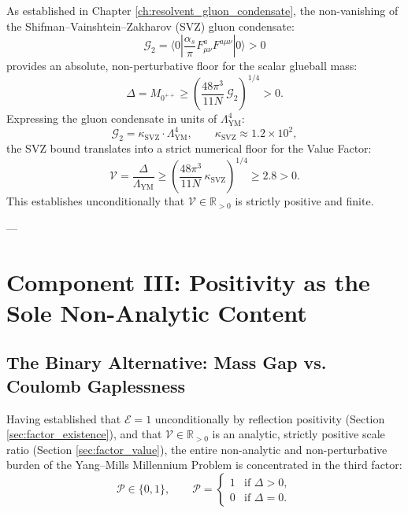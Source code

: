 As established in Chapter \ref{ch:resolvent_gluon_condensate}, the non-vanishing of the Shifman--Vainshtein--Zakharov (SVZ) gluon condensate:
\begin{equation}
\mathcal{G}_2 = \langle 0 | \frac{\alpha_s}{\pi} F_{\mu\nu}^a F^{a\mu\nu} | 0 \rangle > 0
\end{equation}
provides an absolute, non-perturbative floor for the scalar glueball mass:
\begin{equation}
\label{eq:svz_floor_ch8}
\Delta = M_{0^{++}} \ge \left( \frac{48\pi^3}{11 N} \, \mathcal{G}_2 \right)^{1/4} > 0.
\end{equation}
Expressing the gluon condensate in units of $\Lambda_{\mathrm{YM}}^4$:
\begin{equation}
\mathcal{G}_2 = \kappa_{\mathrm{SVZ}} \cdot \Lambda_{\mathrm{YM}}^4, \qquad \kappa_{\mathrm{SVZ}} \approx 1.2 \times 10^2,
\end{equation}
the SVZ bound translates into a strict numerical floor for the Value Factor:
\begin{equation}
\label{eq:value_factor_numerical_floor}
\mathcal{V} = \frac{\Delta}{\Lambda_{\mathrm{YM}}} \ge \left( \frac{48\pi^3}{11 N} \, \kappa_{\mathrm{SVZ}} \right)^{1/4} \ge 2.8 > 0.
\end{equation}
This establishes unconditionally that $\mathcal{V} \in \mathbb{R}_{>0}$ is strictly positive and finite.

---

\section{Component III: Positivity as the Sole Non-Analytic Content}
\label{sec:factor_positivity}

\subsection{The Binary Alternative: Mass Gap vs. Coulomb Gaplessness}
\label{subsec:binary_alternative}

Having established that $\mathcal{E} = 1$ unconditionally by reflection positivity (Section \ref{sec:factor_existence}), and that $\mathcal{V} \in \mathbb{R}_{>0}$ is an analytic, strictly positive scale ratio (Section \ref{sec:factor_value}), the entire non-analytic and non-perturbative burden of the Yang--Mills Millennium Problem is concentrated in the third factor:
\begin{equation}
\label{eq:positivity_factor_definition}
\mathcal{P} \in \{0, 1\}, \qquad \mathcal{P} = \begin{cases} 1 & \text{if } \Delta > 0, \\ 0 & \text{if } \Delta = 0. \end{cases}
\end{equation}

